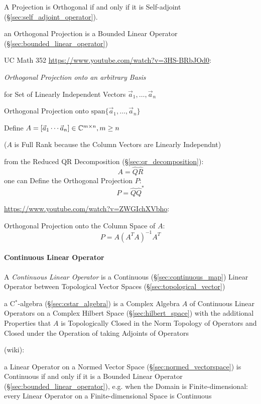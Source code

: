 A Projection is Orthogonal if and only if it is Self-adjoint
(\S\ref{sec:self_adjoint_operator}).

an Orthogonal Projection is a Bounded Linear Operator
(\S\ref{sec:bounded_linear_operator})


UC Math 352 \url{https://www.youtube.com/watch?v=3HS-BRbJOd0}:

\emph{Orthogonal Projection onto an arbitrary Basis}

for Set of Linearly Independent Vectors $\vec{a}_1, \ldots, \vec{a}_n$

Orthogonal Projection onto $\mathrm{span}\{\vec{a}_1, \ldots, \vec{a}_n\}$

Define $A = [\vec{a}_1 \cdots \vec{a}_n] \in \mathbb{C}^{m \times n}, m \geq n$

($A$ is Full Rank because the Column Vectors are Linearly Independnt)

from the Reduced QR Decomposition (\S\ref{sec:qr_decomposition}):
\[
  A = \hat{Q}\hat{R}
\]
one can Define the Orthogonal Projection $P$:
\[
  P = \hat{Q}\hat{Q}^*
\]


\url{https://www.youtube.com/watch?v=ZWGIchXVbho}:

Orthogonal Projection onto the Column Space of $A$:
\[
  P = A(A^TA)^{-1}A^T
\]



\paragraph{Continuous Linear Operator}\label{sec:continuous_linear}\hfill

A \emph{Continuous Linear Operator} is a Continuous
(\S\ref{sec:continuous_map}) Linear Operator between Topological
Vector Spaces (\S\ref{sec:topological_vector})

a C$^*$-algebra (\S\ref{sec:cstar_algebra}) is a Complex Algebra $A$
of Continuous Linear Operators on a Complex Hilbert Space
(\S\ref{sec:hilbert_space}) with the additional Properties that $A$ is
Topologically Closed in the Norm Topology of Operators and Closed
under the Operation of taking Adjoints of Operators

(wiki):

a Linear Operator on a Normed Vector Space
(\S\ref{sec:normed_vectorspace}) is Continuous if and only if it is a
Bounded Linear Operator (\S\ref{sec:bounded_linear_operator}), e.g.
when the Domain is Finite-dimensional: every Linear Operator on a
Finite-dimensional Space is Continuous



